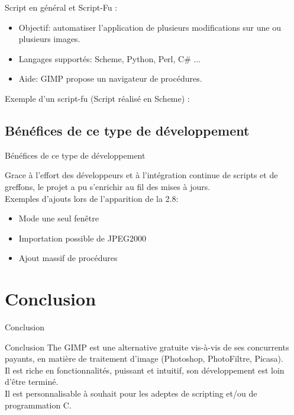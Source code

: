 \documentclass[french]{beamer}
\begin{document}
            \begin{frame}
                Script en général et Script-Fu :
                \begin{itemize}
                    \item Objectif: automatiser l'application de plusieurs modifications sur une ou plusieurs images.
                    \item Langages supportés: Scheme, Python, Perl, C\# ...
                    \item Aide: GIMP propose un navigateur de procédures.
                \end{itemize}
            \end{frame}
            \begin{frame}
                Exemple d'un script-fu (Script réalisé en Scheme) :
                \tiny
            \end{frame}
        \subsection{Bénéfices de ce type de développement}
            \begin{frame}{Bénéfices de ce type de développement}
                \tableofcontents[sectionstyle=show/hide,subsectionstyle=show/shaded/hide]
            \end{frame}
            \begin{frame}
                Grace à l'effort des développeurs et à l'intégration continue de scripts et de greffons, le projet a pu s'enrichir au fil des mises à jours.\\
                Exemples d'ajouts lors de l'apparition de la 2.8:
                \begin{itemize}
                    \item Mode une seul fenêtre
                    \item Importation possible de JPEG2000
                    \item Ajout massif de procédures
                \end{itemize}
            \end{frame}
    \section{Conclusion}
        \begin{frame}{Conclusion}
            \tableofcontents[sectionstyle=show/hide,subsectionstyle=show/shaded/hide]
        \end{frame}
        \begin{frame}
            \begin{block}{Conclusion}
            The GIMP est une alternative gratuite vis-à-vis de ses concurrents payants, en matière de traitement d'image (Photoshop, PhotoFiltre, Picasa).\\
            Il est riche en fonctionnalités, puissant et intuitif, son développement est loin d'être terminé.\\
            Il est personnalisable à souhait pour les adeptes de scripting et/ou de programmation C.
            \end{block}
        \end{frame}        
            
\end{document}
